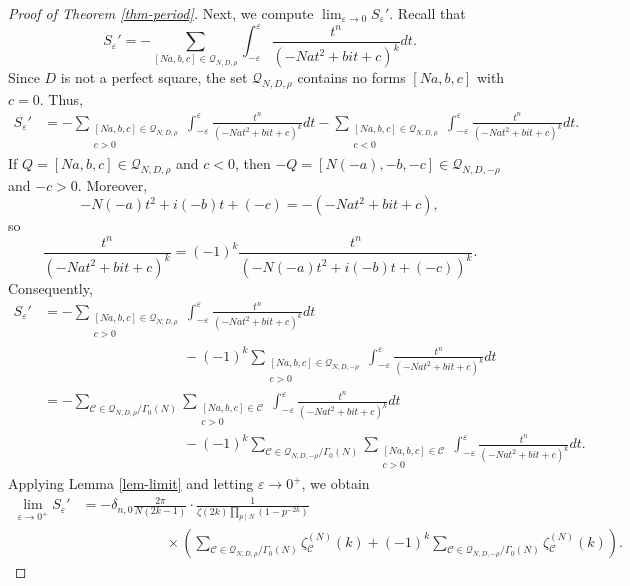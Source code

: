 \documentclass[12pt]{amsart}
\numberwithin{equation}{section}
\theoremstyle{definition}
\begin{document}
\begin{proof}[Proof of Theorem \ref{thm-period}]
Next, we compute $\lim_{\varepsilon\rightarrow 0}S_{\varepsilon}'$. Recall that
$$S_{\varepsilon}'=-\sum_{[Na,b,c]\in\mathcal{Q}_{N,D,\rho}}\int_{-\varepsilon}^{\varepsilon}\frac{t^{n}}{(-Nat^{2}+bit+c)^{k}}dt.$$
Since $D$ is not a perfect square, the set $\mathcal{Q}_{N,D,\rho}$ contains no forms $[Na,b,c]$ with $c=0$. 
Thus,
\begin{align*}
    S_{\varepsilon}'&=-\sum\limits_{\substack{[Na,b,c]\in\mathcal{Q}_{N,D,\rho} \\ c>0}}\int_{-\varepsilon}^{\varepsilon}\frac{t^{n}}{(-Nat^{2}+bit+c)^{k}}dt-\sum\limits_{\substack{[Na,b,c]\in\mathcal{Q}_{N,D,\rho} \\ c<0}}\int_{-\varepsilon}^{\varepsilon}\frac{t^{n}}{(-Nat^{2}+bit+c)^{k}}dt.
\end{align*}
If $Q=[Na,b,c]\in\mathcal{Q}_{N,D,\rho}$ and $c<0$, then $-Q=[N(-a),-b,-c]\in\mathcal{Q}_{N,D,-\rho}$ and $-c>0$. Moreover,
$$-N(-a)t^{2}+i(-b)t+(-c)=-(-Nat^{2}+bit+c),$$
so
$$\frac{t^{n}}{(-Nat^{2}+bit+c)^{k}}=(-1)^{k}\frac{t^{n}}{(-N(-a)t^{2}+i(-b)t+(-c))^{k}}.$$
Consequently,
\begin{equation*}
    \begin{split}
        S_{\varepsilon}'&=-\sum\limits_{\substack{[Na,b,c]\in\mathcal{Q}_{N,D,\rho} \\ c>0}}\int_{-\varepsilon}^{\varepsilon}\frac{t^{n}}{(-Nat^{2}+bit+c)^{k}}dt\\
        &\qquad\qquad\qquad\qquad\qquad-(-1)^{k}\sum\limits_{\substack{[Na,b,c]\in\mathcal{Q}_{N,D,-\rho} \\ c>0}}\int_{-\varepsilon}^{\varepsilon}\frac{t^{n}}{(-Nat^{2}+bit+c)^{k}}dt\\
        &=-\sum_{\mathcal{C}\in\mathcal{Q}_{N,D,\rho}/\Gamma_{0}(N)}\sum\limits_{\substack{[Na,b,c]\in\mathcal{C} \\ c>0}}\int_{-\varepsilon}^{\varepsilon}\frac{t^{n}}{(-Nat^{2}+bit+c)^{k}}dt\\
        &\qquad\qquad\qquad\qquad\qquad-(-1)^{k}\sum_{\mathcal{C}\in\mathcal{Q}_{N,D,-\rho}/\Gamma_{0}(N)}\sum\limits_{\substack{[Na,b,c]\in\mathcal{C} \\ c>0}}\int_{-\varepsilon}^{\varepsilon}\frac{t^{n}}{(-Nat^{2}+bit+c)^{k}}dt.
    \end{split}
\end{equation*}
Applying Lemma \ref{lem-limit} and letting $\varepsilon\rightarrow 0^{+}$, we obtain
\begin{equation*}
    \begin{split}
        \lim_{\varepsilon\rightarrow 0^{+}}S_{\varepsilon}'&=-\delta_{n,0}\frac{2\pi}{N(2k-1)}\cdot\frac{1}{\zeta(2k)\prod_{p\mid N}(1-p^{-2k})}\\
        &\qquad\qquad\qquad\times\left(\sum_{\mathcal{C}\in\mathcal{Q}_{N,D,\rho}/\Gamma_{0}(N)}\zeta_{\mathcal{C}}^{(N)}(k)+(-1)^{k}\sum_{\mathcal{C}\in\mathcal{Q}_{N,D,-\rho}/\Gamma_{0}(N)}\zeta_{\mathcal{C}}^{(N)}(k)\right).
    \end{split}
\end{equation*}


\end{proof}
\end{document}

